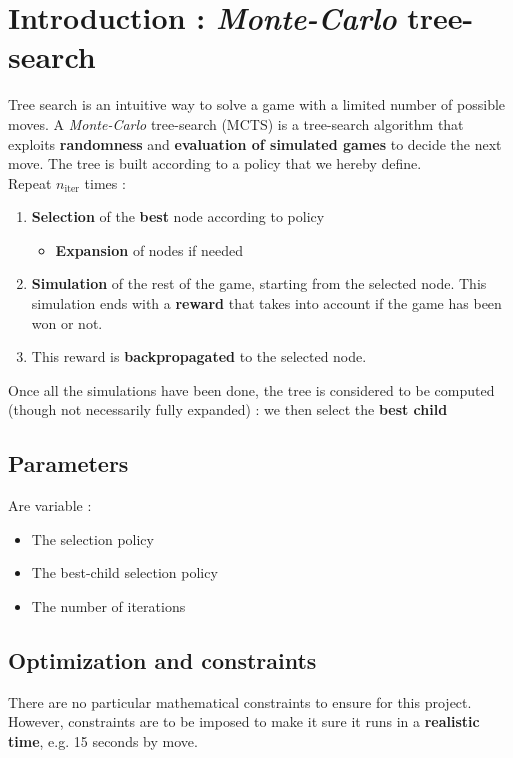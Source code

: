 \documentclass[11pt,a4paper]{article}
\begin{document}
\newpage
\tableofcontents

 

\section{Introduction : \textit{Monte-Carlo} tree-search}
Tree search is an intuitive way to solve a game with a limited number of possible moves. A \textit{Monte-Carlo} tree-search (MCTS) is a tree-search algorithm that exploits \textbf{randomness} and \textbf{evaluation of simulated games} to decide the next move. The tree is built according to a policy that we hereby define.\\

Repeat $n_{\text{iter}}$ times : 
\begin{enumerate}
    \item \textbf{Selection} of the \textbf{best} node according to policy  
    \begin{itemize}[label=\tiny$\blacksquare$]
        \item \textbf{Expansion} of nodes if needed
    \end{itemize}
    \item \textbf{Simulation} of the rest of the game, starting from the selected node. This simulation ends with a \textbf{reward} that takes into account if the game has been won or not.
    \item This reward is \textbf{backpropagated} to the selected node. 
\end{enumerate}
Once all the simulations have been done, the tree is considered to be computed (though not necessarily fully expanded) : we then select the \textbf{best child}\\

\subsection{Parameters}
Are variable :
\begin{itemize}
    \item The selection policy
    \item The best-child selection policy
    \item The number of iterations
\end{itemize}

\subsection{Optimization and constraints}
There are no particular mathematical constraints to ensure for this project. However, constraints are to be imposed to make it sure it runs in a \textbf{realistic time}, e.g. 15 seconds by move. \\
\end{document}
